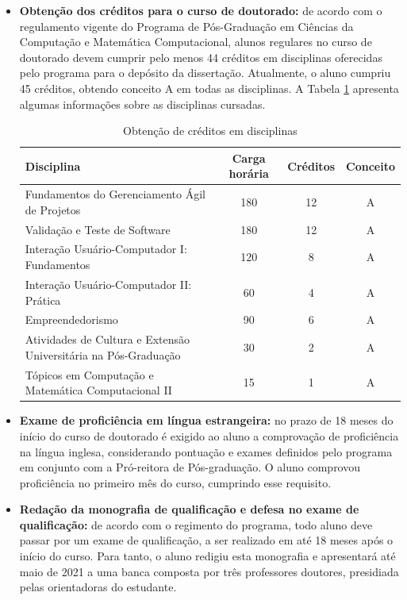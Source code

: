 \begin{itemize}

\item \textbf{Obtenção dos créditos para o curso de doutorado:} de acordo com o regulamento vigente do Programa de Pós-Graduação em Ciências da Computação e Matemática Computacional, alunos regulares no curso de doutorado devem cumprir pelo menos 44 créditos em disciplinas oferecidas pelo programa para o depósito da dissertação. Atualmente, o aluno cumpriu 45 créditos, obtendo conceito A em todas as disciplinas. A Tabela \ref{tab:creditos} apresenta algumas informações sobre as disciplinas cursadas.

\begin{table}[h]
\centering
\caption{Obtenção de créditos em disciplinas}
\label{tab:creditos}
\begin{tabular}{p{7cm}ccc}
\hline
\textbf{Disciplina} & \textbf{Carga horária} & \textbf{Créditos} & \textbf{Conceito} \\ \hline
Fundamentos do Gerenciamento Ágil de Projetos & 180 & 12 & A \\
Validação e Teste de Software & 180 & 12 & A \\
Interação Usuário-Computador I: Fundamentos & 120 & 8 & A \\
Interação Usuário-Computador II: Prática & 60 & 4 & A \\
Empreendedorismo & 90 & 6 & A \\
Atividades de Cultura e Extensão Universitária na Pós-Graduação & 30 & 2 & A \\
Tópicos em Computação e Matemática Computacional II & 15 & 1 & A \\ \hline
\end{tabular}
\end{table}

\item \textbf{Exame de proficiência em língua estrangeira:} no prazo de 18 meses do início do curso de doutorado é exigido ao aluno a comprovação de proficiência na língua inglesa, considerando pontuação e exames definidos pelo programa em conjunto com a Pró-reitora de Pós-graduação. O aluno comprovou proficiência no primeiro mês do curso, cumprindo esse requisito.

\item \textbf{Redação da monografia de qualificação e defesa no exame de qualificação:} de acordo com o regimento do programa, todo aluno deve passar por um exame de qualificação, a ser realizado em até 18 meses após o início do curso. Para tanto, o aluno redigiu esta monografia e apresentará até maio de 2021 a uma banca composta por três professores doutores, presidiada pelas orientadoras do estudante.


\end{itemize}
